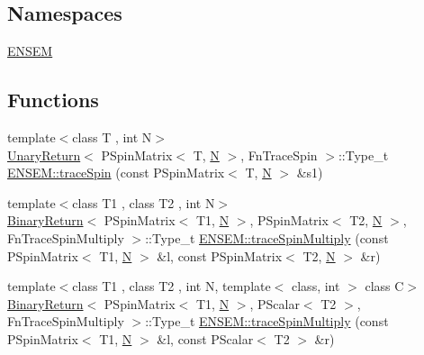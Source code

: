 \subsection*{Namespaces}
\begin{DoxyCompactItemize}
\item 
 \mbox{\hyperlink{namespaceENSEM}{E\+N\+S\+EM}}
\end{DoxyCompactItemize}
\subsection*{Functions}
\begin{DoxyCompactItemize}
\item 
{\footnotesize template$<$class T , int N$>$ }\\\mbox{\hyperlink{structUnaryReturn}{Unary\+Return}}$<$ P\+Spin\+Matrix$<$ T, \mbox{\hyperlink{adat__devel_2lib_2hadron_2operator__name__util_8cc_a7722c8ecbb62d99aee7ce68b1752f337}{N}} $>$, Fn\+Trace\+Spin $>$\+::Type\+\_\+t \mbox{\hyperlink{group__primspinmatrix_gaf2ad1f1c91e0de897096d4164e090641}{E\+N\+S\+E\+M\+::trace\+Spin}} (const P\+Spin\+Matrix$<$ T, \mbox{\hyperlink{adat__devel_2lib_2hadron_2operator__name__util_8cc_a7722c8ecbb62d99aee7ce68b1752f337}{N}} $>$ \&s1)
\item 
{\footnotesize template$<$class T1 , class T2 , int N$>$ }\\\mbox{\hyperlink{structBinaryReturn}{Binary\+Return}}$<$ P\+Spin\+Matrix$<$ T1, \mbox{\hyperlink{adat__devel_2lib_2hadron_2operator__name__util_8cc_a7722c8ecbb62d99aee7ce68b1752f337}{N}} $>$, P\+Spin\+Matrix$<$ T2, \mbox{\hyperlink{adat__devel_2lib_2hadron_2operator__name__util_8cc_a7722c8ecbb62d99aee7ce68b1752f337}{N}} $>$, Fn\+Trace\+Spin\+Multiply $>$\+::Type\+\_\+t \mbox{\hyperlink{group__primspinmatrix_gab5c053ea22b374090822742e46ebd402}{E\+N\+S\+E\+M\+::trace\+Spin\+Multiply}} (const P\+Spin\+Matrix$<$ T1, \mbox{\hyperlink{adat__devel_2lib_2hadron_2operator__name__util_8cc_a7722c8ecbb62d99aee7ce68b1752f337}{N}} $>$ \&l, const P\+Spin\+Matrix$<$ T2, \mbox{\hyperlink{adat__devel_2lib_2hadron_2operator__name__util_8cc_a7722c8ecbb62d99aee7ce68b1752f337}{N}} $>$ \&r)
\item 
{\footnotesize template$<$class T1 , class T2 , int N, template$<$ class, int $>$ class C$>$ }\\\mbox{\hyperlink{structBinaryReturn}{Binary\+Return}}$<$ P\+Spin\+Matrix$<$ T1, \mbox{\hyperlink{adat__devel_2lib_2hadron_2operator__name__util_8cc_a7722c8ecbb62d99aee7ce68b1752f337}{N}} $>$, P\+Scalar$<$ T2 $>$, Fn\+Trace\+Spin\+Multiply $>$\+::Type\+\_\+t \mbox{\hyperlink{group__primspinmatrix_ga397616dd6ad517f1cf893903cd93c2c8}{E\+N\+S\+E\+M\+::trace\+Spin\+Multiply}} (const P\+Spin\+Matrix$<$ T1, \mbox{\hyperlink{adat__devel_2lib_2hadron_2operator__name__util_8cc_a7722c8ecbb62d99aee7ce68b1752f337}{N}} $>$ \&l, const P\+Scalar$<$ T2 $>$ \&r)

\end{DoxyCompactItemize}
